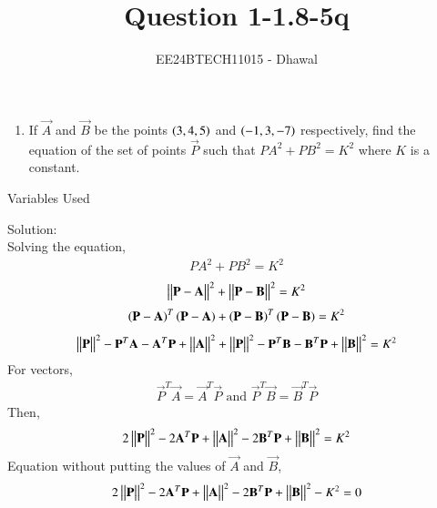 \documentclass[journal]{IEEEtran}
\numberwithin{equation}{enumi}
\numberwithin{figure}{enumi}
\begin{document}

\title{Question 1-1.8-5q}
\author{EE24BTECH11015 - Dhawal}
{\let\newpage\relax\maketitle}
\begin{enumerate}
	\item If $\vec{A}$ and $\vec{B}$ be the points $\left(3,4,5\right)$ and $\left(-1,3,-7\right)$ respectively, find the equation of the set of points $\vec{P}$ such that ${PA}^2+{PB}^2=K^2$ where $K$ is a constant.
\end{enumerate}
\begin{table}[h!]    
  \centering
  
  \caption{Variables Used}
  \label{tab 1.4.9.2}
\end{table}
Solution:\\
Solving the equation,
\begin{align}
        {PA}^2+{PB}^2=K^2
        \end{align}
        \begin{align}
        \begin{vmatrix}\begin{vmatrix}\mathbf{P}-\mathbf{A}\end{vmatrix}\end{vmatrix}^2+\begin{vmatrix}\begin{vmatrix}\mathbf{P}-\mathbf{B}\end{vmatrix}\end{vmatrix}^2=K^2
        \end{align}
        \begin{align}
        \left(\mathbf{P}-\mathbf{A}\right)^{T} \left(\mathbf{P}-\mathbf{A}\right)+\left(\mathbf{P}-\mathbf{B}\right)^{T}\left(\mathbf{P}-\mathbf{B}\right)=K^2
        \end{align}
        \begin{align}
        \begin{vmatrix}\begin{vmatrix}\mathbf{P}\end{vmatrix}\end{vmatrix}^2 -\mathbf{P}^{T}\mathbf{A}-\mathbf{A}^{T}\mathbf{P}+\begin{vmatrix}\begin{vmatrix}\mathbf{A}\end{vmatrix}\end{vmatrix}^2 +\begin{vmatrix}\begin{vmatrix}\mathbf{P}\end{vmatrix}\end{vmatrix}^2 -\mathbf{P}^{T}\mathbf{B}-\mathbf{B}^{T}\mathbf{P}+\begin{vmatrix}\begin{vmatrix}\mathbf{B}\end{vmatrix}\end{vmatrix}^2 =K^2
\end{align}
For vectors,
\begin{align}
	\vec{P}^{T}\vec{A}=\vec{A}^{T}\vec{P} \text{ and } \vec{P}^{T}\vec{B}=\vec{B}^{T}\vec{P}
\end{align}
Then,
\begin{align}
	2\begin{vmatrix}\begin{vmatrix}\mathbf{P}\end{vmatrix}\end{vmatrix}^2  -2\mathbf{A}^{T}\mathbf{P}+\begin{vmatrix}\begin{vmatrix}\mathbf{A}\end{vmatrix}\end{vmatrix}^2 -2\mathbf{B}^{T}\mathbf{P}+\begin{vmatrix}\begin{vmatrix}\mathbf{B}\end{vmatrix}\end{vmatrix}^2 =K^2
\end{align}
Equation without putting the values of $\vec{A}$ and $\vec{B}$,
\begin{align}
	2\begin{vmatrix}\begin{vmatrix}\mathbf{P}\end{vmatrix}\end{vmatrix}^2  -2\mathbf{A}^{T}\mathbf{P}+\begin{vmatrix}\begin{vmatrix}\mathbf{A}\end{vmatrix}\end{vmatrix}^2 -2\mathbf{B}^{T}\mathbf{P}+\begin{vmatrix}\begin{vmatrix}\mathbf{B}\end{vmatrix}\end{vmatrix}^2 -K^2=0
\end{align}
\end{document}
